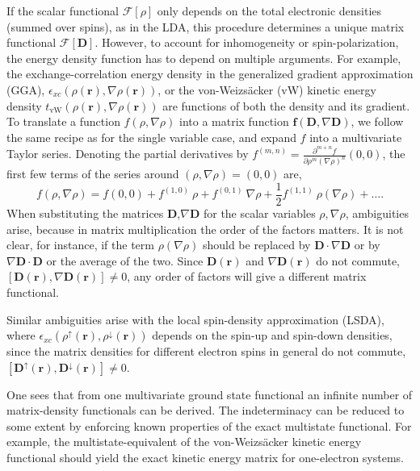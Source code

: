 \documentclass[journal=jpclcd,manuscript=letter]{achemso}
\newcommand\m[1]{\mathbf{#1}}
\renewcommand\vec[1]{\mathbf{#1}}
\begin{document}
If the scalar functional $\mathcal{F}[\rho]$ only depends on the total electronic densities (summed over spins), as in the LDA,
this procedure determines a unique matrix functional $\m{\mathcal{F}}[\m{D}]$.
However, to account for inhomogeneity or spin-polarization,
the energy density function has to depend on multiple arguments. For example, the exchange-correlation energy density in
the generalized gradient approximation (GGA), $\epsilon_{xc}(\rho(\vec{r}),\nabla \rho(\vec{r}))$, 
or the von-Weizs\"{a}cker (vW) kinetic energy density $t_{\text{vW}}(\rho(\vec{r}),\nabla \rho(\vec{r}))$ are functions of both the density and its gradient.
To translate a function $f(\rho,\nabla \rho)$ into a matrix function $\m{f}(\m{D},\nabla \m{D})$,
we follow the same recipe as for the single variable case, and expand $f$ into a multivariate Taylor series.
Denoting the partial derivatives by $f^{(m,n)} = \frac{\partial^{m+n} f}{\partial \rho^{m} (\nabla \rho)^{n}}(0,0)$, the first few terms
of the series around $(\rho,\nabla \rho) = (0,0)$ are,
\begin{equation}
 f(\rho,\nabla \rho) = f(0,0) + f^{(1,0)}~\rho + f^{(0,1)} ~ \nabla \rho + \frac{1}{2} f^{(1,1)} ~ \rho(\nabla \rho) + \ldots.
\end{equation}
When substituting the matrices $\m{D}$,$\nabla \m{D}$ for the scalar variables $\rho,\nabla \rho$, ambiguities arise,
because in matrix multiplication the order of the factors matters. It is not clear, for instance,
if the term $\rho (\nabla \rho)$
should be replaced by $\m{D} \cdot \nabla  \m{D}$ or by $\nabla \m{D} \cdot \m{D}$
or the average of the two. Since $\m{D}(\vec{r})$ and $\nabla \m{D}(\vec{r})$ do not commute,
$[\m{D}(\vec{r}),\nabla \m{D}(\vec{r})] \neq 0$, any order of factors will give
a different matrix functional.

Similar ambiguities arise with the local spin-density approximation (LSDA),
where $\epsilon_{xc}(\rho^{\uparrow}(\vec{r}), \rho^{\downarrow}(\vec{r}))$
depends on the spin-up and spin-down densities, since the matrix densities for different electron spins
in general do not commute, $[\m{D}^{\uparrow}(\vec{r}), \m{D}^{\downarrow}(\vec{r})] \neq 0$.

One sees that from one multivariate ground state functional an infinite number of matrix-density functionals can be derived.
The indeterminacy can be reduced to some extent by enforcing known properties of the exact multistate functional.
For example, the multistate-equivalent of the von-Weizs\"{a}cker kinetic energy functional should yield the
exact kinetic energy matrix for one-electron systems.
\end{document}
